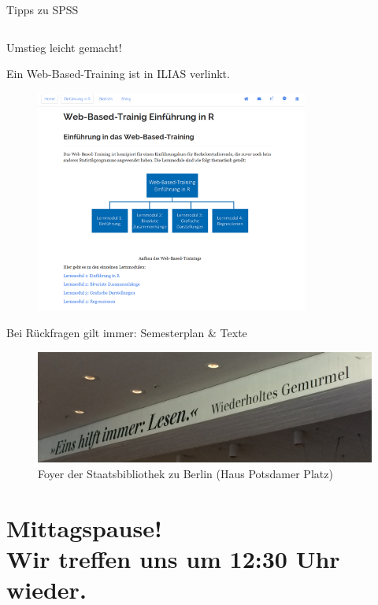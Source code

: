 \documentclass[11pt]{beamer}
\begin{document}
\begin{frame}{Tipps zu SPSS}
\begin{columns}
	\end{columns}
\end{frame}

\begin{frame}{Umstieg leicht gemacht!}
	\begin{center}
	Ein Web-Based-Training ist in ILIAS verlinkt.\\
				\begin{figure}[ht]
					\includegraphics[width=0.8\textwidth]{pics/pre13.png}
				\end{figure}	
			\end{center}		
\end{frame}

\begin{frame}{Bei Rückfragen gilt immer: Semesterplan \& Texte}
	\begin{center}
				\begin{figure}[ht]
					\includegraphics[width=\textwidth]{pics/pre14.png}
					\caption{Foyer der Staatsbibliothek zu Berlin (Haus Potsdamer Platz)}
				\end{figure}	
			\end{center}		
\end{frame}

\section{Mittagspause! \\ Wir treffen uns um 12:30 Uhr wieder.}
\end{document}

